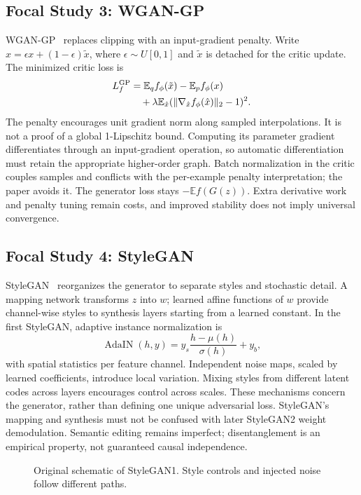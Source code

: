 \documentclass[conference]{IEEEtran}
\newcommand{\E}{\mathbb{E}}
\begin{document}
\subsection{Focal Study 3: WGAN-GP}
WGAN-GP~\cite{gp} replaces clipping with an input-gradient penalty. Write $\hat x=\epsilon x+(1-\epsilon)\tilde x$, where $\epsilon\sim U[0,1]$ and $\tilde x$ is detached for the critic update. The minimized critic loss is
\begin{align}
L_f^{\rm GP}&=\E_q f_\phi(\tilde x)-\E_p f_\phi(x)\nonumber\\
&\quad+\lambda\E_{\hat x}(\|\nabla_{\hat x}f_\phi(\hat x)\|_2-1)^2.
\end{align}
The penalty encourages unit gradient norm along sampled interpolations. It is not a proof of a global 1-Lipschitz bound. Computing its parameter gradient differentiates through an input-gradient operation, so automatic differentiation must retain the appropriate higher-order graph. Batch normalization in the critic couples samples and conflicts with the per-example penalty interpretation; the paper avoids it. The generator loss stays $-\E f(G(z))$. Extra derivative work and penalty tuning remain costs, and improved stability does not imply universal convergence.

\subsection{Focal Study 4: StyleGAN}
StyleGAN~\cite{style} reorganizes the generator to separate styles and stochastic detail. A mapping network transforms $z$ into $w$; learned affine functions of $w$ provide channel-wise styles to synthesis layers starting from a learned constant. In the first StyleGAN, adaptive instance normalization is
\begin{equation}
\operatorname{AdaIN}(h,y)=y_s\frac{h-\mu(h)}{\sigma(h)}+y_b,
\end{equation}
with spatial statistics per feature channel. Independent noise maps, scaled by learned coefficients, introduce local variation. Mixing styles from different latent codes across layers encourages control across scales. These mechanisms concern the generator, rather than defining one unique adversarial loss. StyleGAN's mapping and synthesis must not be confused with later StyleGAN2 weight demodulation. Semantic editing remains imperfect; disentanglement is an empirical property, not guaranteed causal independence.

\begin{figure}[t]\centering
{}
\caption{Original schematic of StyleGAN1. Style controls and injected noise follow different paths.}\end{figure}
\end{document}
